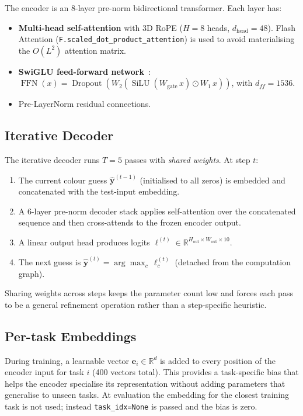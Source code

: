 \documentclass[11pt,a4paper]{article}
\begin{document}
The encoder is an 8-layer pre-norm bidirectional transformer.  Each layer has:
\begin{itemize}[noitemsep]
  \item \textbf{Multi-head self-attention} with 3D RoPE ($H{=}8$ heads,
        $d_{\text{head}}{=}48$).  Flash Attention
        (\texttt{F.scaled\_dot\_product\_attention}) is used to avoid materialising the
        $O(L^2)$ attention matrix.
  \item \textbf{SwiGLU feed-forward network}~\cite{shazeer2020glu}:
        $\operatorname{FFN}(x) = \operatorname{Dropout}\!\left(W_2\!\left(\operatorname{SiLU}(W_{\text{gate}}\,x)\odot W_1\,x\right)\right)$,
        with $d_{ff}{=}1536$.
  \item Pre-LayerNorm residual connections.
\end{itemize}

\subsection{Iterative Decoder}
\label{ssec:decoder}

The iterative decoder runs $T{=}5$ passes with \emph{shared weights}.  At step $t$:

\begin{enumerate}[noitemsep]
  \item The current colour guess $\hat{\mathbf{y}}^{(t-1)}$ (initialised to all zeros)
        is embedded and concatenated with the test-input embedding.
  \item A 6-layer pre-norm decoder stack applies self-attention over the concatenated
        sequence and then cross-attends to the frozen encoder output.
  \item A linear output head produces logits
        $\ell^{(t)} \in \mathbb{R}^{H_{\text{out}} \times W_{\text{out}} \times 10}$.
  \item The next guess is $\hat{\mathbf{y}}^{(t)} = \arg\max_c\,\ell^{(t)}_c$ (detached
        from the computation graph).
\end{enumerate}

Sharing weights across steps keeps the parameter count low and forces each pass to be
a general refinement operation rather than a step-specific heuristic.

\subsection{Per-task Embeddings}

During training, a learnable vector $\mathbf{e}_i \in \mathbb{R}^{d}$ is added to
every position of the encoder input for task $i$ (400 vectors total).  This provides a
task-specific bias that helps the encoder specialise its representation without adding
parameters that generalise to unseen tasks.  At evaluation the embedding for the
closest training task is not used; instead \texttt{task\_idx=None} is passed and the
bias is zero.
\end{document}
